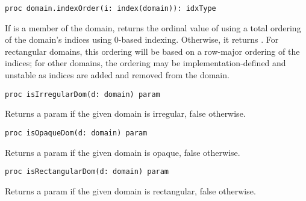 \begin{protohead}
\begin{verbatim}
proc domain.indexOrder(i: index(domain)): idxType
\end{verbatim}
\end{protohead}
\begin{protobody}
If  is a member of the domain, returns the ordinal value of
 using a total ordering of the domain's indices using 0-based
indexing.  Otherwise, it returns .  For rectangular
domains, this ordering will be based on a row-major ordering of the
indices; for other domains, the ordering may be
implementation-defined and unstable as indices are added and
removed from the domain.
\end{protobody}

\begin{protohead}
\begin{verbatim}
proc isIrregularDom(d: domain) param
\end{verbatim}
\end{protohead}
\begin{protobody}
Returns a param  if the given domain is irregular, false otherwise.
\end{protobody}

\begin{protohead}
\begin{verbatim}
proc isOpaqueDom(d: domain) param
\end{verbatim}
\end{protohead}
\begin{protobody}
Returns a param  if the given domain is opaque, false otherwise.
\end{protobody}

\begin{protohead}
\begin{verbatim}
proc isRectangularDom(d: domain) param
\end{verbatim}
\end{protohead}
\begin{protobody}
Returns a param  if the given domain is rectangular, false otherwise.
\end{protobody}

